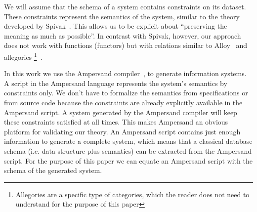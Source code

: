 \documentclass{elsarticle}
\begin{document}
   We will assume that the schema of a system contains constraints on its dataset.
   These constraints represent the semantics of the system, similar to the theory developed by Spivak~\cite{Spivak2012}.
   This allows us to be explicit about ``preserving the meaning as much as possible''.
   In contrast with Spivak, however, our approach does not work with functions (functors)
   but with relations similar to Alloy~\cite{Alloy2006} and allegories%
\footnote{Allegories are a specific type of categories, which the reader does not need to understand for the purpose of this paper}~\cite{Zielinski2013}.

   In this work we use the Ampersand compiler~\cite{Joosten-JLAMP2018},
   to generate information systems.
   A script in the Ampersand language represents the system's semantics by constraints only.
   We don't have to formalize the semantics from specifications or from source code
   because the constraints are already explicitly available in the Ampersand script.
   A system generated by the Ampersand compiler will keep these constraints satisfied at all times.
   This makes Ampersand an obvious platform for validating our theory.
   An Ampersand script contains just enough information to generate a complete system,
   which means that a classical database schema (i.e. data structure plus semantics) can be extracted from the Ampersand script.
   For the purpose of this paper we can equate an Ampersand script with the schema of the generated system.
\end{document}

